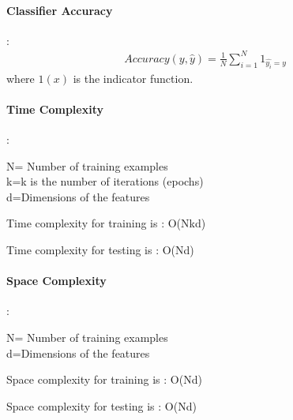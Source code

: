 \documentclass[11pt]{article}
\begin{document}
\paragraph{Classifier Accuracy }: 
\begin{align*}
    Accuracy (y, {\hat{y}})= \frac{1}{N} \sum_{i=1}^{N} {1}_{{\hat{y_{i}}} = y}
\end{align*}
where ${1} (x)$  is the indicator function.


\paragraph{Time Complexity}:

N= Number of training examples\\
k=k is the number of iterations (epochs)\\ 
d=Dimensions of the features

Time complexity for training is : O(Nkd)

Time complexity for testing is : O(Nd)


\paragraph{Space Complexity}:

N= Number of training examples\\
d=Dimensions of the features

Space complexity for training is : O(Nd)

Space complexity for testing is : O(Nd)
\end{document}
